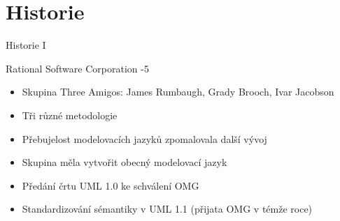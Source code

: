 \section{Historie}




\begin{frame}{Historie I}

\onslide<+->Rational Software Corporation 
\newline
{}-5 
\begin{itemize}
    \item Skupina Three Amigos: James Rumbaugh, Grady Brooch, Ivar Jacobson
    \item<+->Tři různé metodologie
\end{itemize}                     

\begin{itemize}
    \item Přebujelost modelovacích jazyků zpomalovala další vývoj
    \item<+->Skupina měla vytvořit obecný modelovací jazyk
\end{itemize}      

\begin{itemize}
    \item Předání črtu UML 1.0 ke schválení OMG
    \item<+->Standardizování sémantiky v UML 1.1 (přijata OMG v témže roce)
\end{itemize}         
	
\end{frame}


